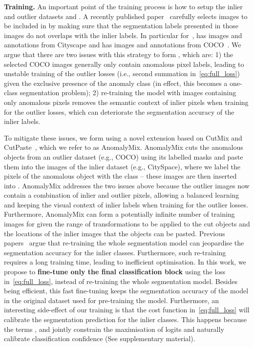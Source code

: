 \documentclass[runningheads]{llncs}
\begin{document}
\noindent\textbf{Training.} An important point of the training process is how to setup the inlier and outlier datasets  and .
A recently published paper~\cite{chan2021entropy} carefully selects images to be included in  by making sure that 
the segmentation labels presented in those images do not overlaps with the inlier labels. In particular for~\cite{chan2021entropy},   has images and annotations from Cityscape and  has images and annotations from COCO~\cite{lin2014microsoft}. We argue that there are two issues with this strategy to form , which are: 1) the selected COCO images generally only contain anomalous pixel labels, leading to unstable training 
of the outlier losses (i.e., second summation in~\eqref{eq:full_loss}) given the exclusive presence of the anomaly class (in effect, this becomes a one-class segmentation problem);  
2) re-training the model with images containing only anomalous pixels removes the semantic context of inlier pixels when training for the outlier losses, which 
can deteriorate the segmentation accuracy of the inlier labels. 

To mitigate these issues, 
we form  using a novel extension based on CutMix and CutPaste~\cite{yun2019cutmix,li2021cutpaste}, which we refer to as AnomalyMix.
AnomalyMix cuts the anomalous objects
from an outlier dataset (e.g., COCO) using its labelled masks and paste them into the images of the inlier dataset (e.g., CitySpace), where we label the pixels of the anomalous object with the class  -- these images are then inserted into .
AnomalyMix addresses the two issues above because the outlier images now contain a combination of inlier and outlier pixels, allowing a balanced learning and keeping the visual context of inlier labels when training for the outlier losses.
Furthermore, AnomalyMix can form a potentially infinite number of training images for  given the range of transformations to be applied to the cut objects and the locations of the inlier images that the objects can be pasted.
Previous papers~\cite{di2021pixel,jung2021standardized} argue that re-training the whole segmentation model can jeopardise the segmentation accuracy for the inlier classes. Furthermore, such re-training requires a long training time, leading to inefficient optimisation. 
In this work, we propose to \textbf{fine-tune only the final classification block} 
using the loss in~\eqref{eq:full_loss}, instead of re-training the whole segmentation model.
Besides being efficient, this fast fine-tuning keeps the segmentation accuracy of the model in the original dataset used for pre-training the model. 
Furthermore, an interesting side-effect of our training is that the cost function in~\eqref{eq:full_loss} will calibrate the segmentation prediction for the inlier classes. 
This happens because the terms ,   and  jointly constrain the maximisation of logits and naturally calibrate classification confidence (See supplementary material). 
\end{document}
